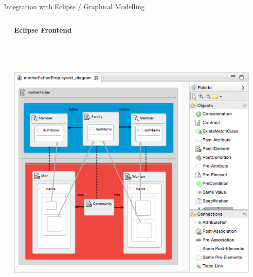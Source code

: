 \documentclass[final,hyperref={pdfpagelabels=false}]{beamer}
\begin{document}
\begin{frame}{}
\begin{block}{Integration with Eclipse / Graphical Modelling}
\begin{columns}[t,totalwidth=\linewidth]
\begin{column}{.585\linewidth}
       \end{column}
       \begin{column}{.385\linewidth}
      \begin{center}
      \footnotesize
      \textbf{Eclipse Frontend}
      \includegraphics[height=15cm]{figures/eclipse_frontend}
      \end{center}
        
       
        \end{column}
              \end{columns}
        \end{block}
      

\end{frame}
\end{document}
